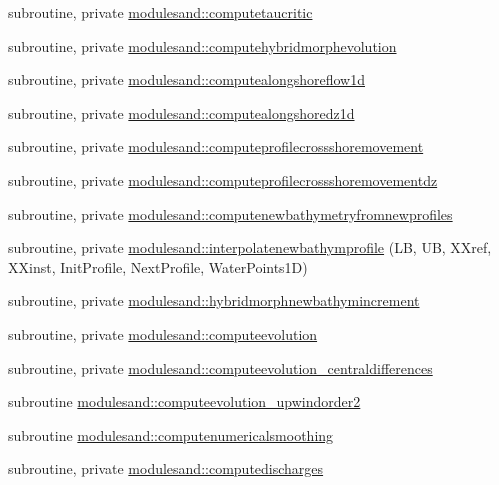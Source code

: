 \begin{DoxyCompactItemize}
subroutine, private \mbox{\hyperlink{namespacemodulesand_a59ce9cc4ddca10eedae7fbc2ca0c2583}{modulesand\+::computetaucritic}}
\item 
subroutine, private \mbox{\hyperlink{namespacemodulesand_ac778a6b170dc738d265d1108248728f3}{modulesand\+::computehybridmorphevolution}}
\item 
subroutine, private \mbox{\hyperlink{namespacemodulesand_a88ad4d02a6e8f1f1c1585f441fd8a910}{modulesand\+::computealongshoreflow1d}}
\item 
subroutine, private \mbox{\hyperlink{namespacemodulesand_a608f78fe34da2344f75a4b2f32487eae}{modulesand\+::computealongshoredz1d}}
\item 
subroutine, private \mbox{\hyperlink{namespacemodulesand_abe98db28fdf5e787bd658f6e3b181923}{modulesand\+::computeprofilecrossshoremovement}}
\item 
subroutine, private \mbox{\hyperlink{namespacemodulesand_a5316ef806da7d9e5bca8d121c7f5fa28}{modulesand\+::computeprofilecrossshoremovementdz}}
\item 
subroutine, private \mbox{\hyperlink{namespacemodulesand_a27c9023e77c121f3086720bf6e9e8842}{modulesand\+::computenewbathymetryfromnewprofiles}}
\item 
subroutine, private \mbox{\hyperlink{namespacemodulesand_abe7195f0a91ff792f6a36bea021901b1}{modulesand\+::interpolatenewbathymprofile}} (LB, UB, X\+Xref, X\+Xinst, Init\+Profile, Next\+Profile, Water\+Points1D)
\item 
subroutine, private \mbox{\hyperlink{namespacemodulesand_a16ec0bd3dc1304583be21920d21c0a74}{modulesand\+::hybridmorphnewbathymincrement}}
\item 
subroutine, private \mbox{\hyperlink{namespacemodulesand_ad15b8bd8644b2a7c104622be042c70be}{modulesand\+::computeevolution}}
\item 
subroutine, private \mbox{\hyperlink{namespacemodulesand_a0a0730547aa0d650a7bcc24395ba4cea}{modulesand\+::computeevolution\+\_\+centraldifferences}}
\item 
subroutine \mbox{\hyperlink{namespacemodulesand_ade72cd18189ac41b25eef5f7f97591dc}{modulesand\+::computeevolution\+\_\+upwindorder2}}
\item 
subroutine \mbox{\hyperlink{namespacemodulesand_aa8ec28ffb1310d31679a5053863f3452}{modulesand\+::computenumericalsmoothing}}
\item 
subroutine, private \mbox{\hyperlink{namespacemodulesand_a7c4449ee64c2b5e75dfe0924a2f83231}{modulesand\+::computedischarges}}
\item 

\end{DoxyCompactItemize}

